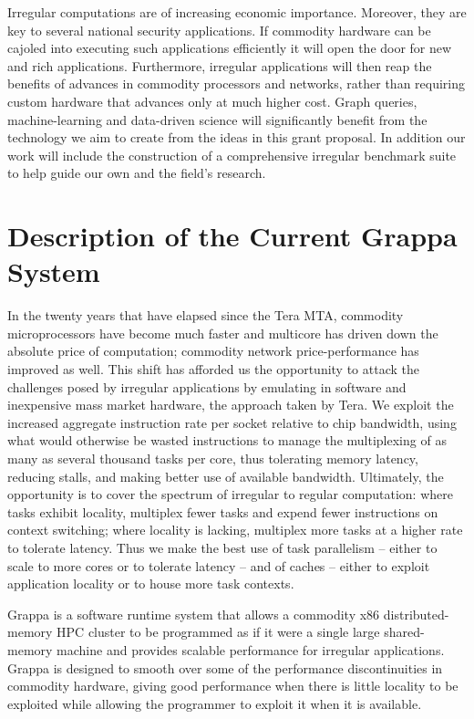 Irregular computations are of increasing economic importance.  Moreover, they are key to several national security applications.  If commodity hardware can be cajoled into executing such applications efficiently it will open the door for new and rich applications.  Furthermore, irregular applications will then reap the benefits of advances in commodity processors and networks, rather than requiring custom hardware that advances only at much higher cost.  Graph queries, machine-learning and data-driven science will significantly benefit from the technology we aim to create from the ideas in this grant proposal.  In addition our work will include the construction of a comprehensive irregular benchmark suite to help guide our own and the field's research.


\section{Description of the Current Grappa System}

In the twenty years that have elapsed since the Tera MTA, commodity microprocessors have become much faster and multicore has driven down the absolute price of computation; commodity network price-performance has improved as well. This shift has afforded us the opportunity to attack the challenges posed by irregular applications by emulating in software and inexpensive mass market hardware, the approach taken by Tera. We exploit the increased aggregate instruction rate per socket relative to chip bandwidth, using what would otherwise be wasted instructions to manage the multiplexing of as many as several thousand tasks per core, thus tolerating memory latency, reducing stalls, and making better use of available bandwidth. Ultimately, the opportunity is to cover the spectrum of irregular to regular computation: where tasks exhibit locality, multiplex fewer tasks and expend fewer instructions on context switching; where locality is lacking, multiplex more tasks at a higher rate to tolerate latency. Thus we make the best use of task parallelism -- either to scale to more cores or to tolerate latency -- and of caches -- either to exploit application locality or to house more task contexts.

Grappa is a software runtime system that allows a commodity x86 distributed-memory HPC cluster to be programmed as if it were a single large shared-memory machine and provides scalable performance for irregular applications. Grappa is designed to smooth over some of the performance discontinuities in commodity hardware, giving good performance when there is little locality to be exploited while allowing the programmer to exploit it when it is available.

